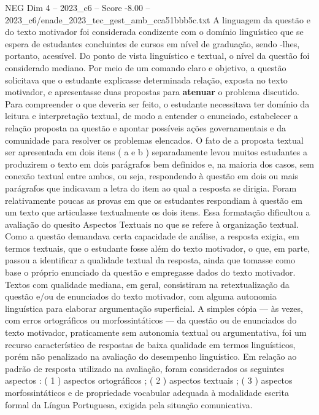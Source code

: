 \begin{textsample}{NEG Dim 4 – 2023\_c6 – Score -8.00 – 2023\_c6/enade\_2023\_tec\_gest\_amb\_cca51bbb5c.txt}
A linguagem da questão e do texto motivador foi considerada condizente com o domínio linguístico que se espera de estudantes concluintes de cursos em nível de graduação, sendo -lhes, portanto, acessível.
Do ponto de vista linguístico e textual, o nível da questão foi considerado mediano.
Por meio de um comando claro e objetivo, a questão solicitava que o estudante explicasse determinada relação, exposta no texto motivador, e apresentasse duas propostas para \textbf{atenuar} o problema discutido.
Para compreender o que deveria ser feito, o estudante necessitava ter domínio da leitura e interpretação textual, de modo a entender o enunciado, estabelecer a relação proposta na questão e apontar possíveis ações governamentais e da comunidade para resolver os problemas elencados.
O fato de a proposta textual ser apresentada em dois itens ( a e b ) separadamente levou muitos estudantes a produzirem o texto em dois parágrafos bem definidos e, na maioria dos casos, sem conexão textual entre ambos, ou seja, respondendo à questão em dois ou mais parágrafos que indicavam a letra do item ao qual a resposta se dirigia.
Foram relativamente poucas as provas em que os estudantes respondiam à questão em um texto que articulasse textualmente os dois itens.
Essa formatação dificultou a avaliação do quesito Aspectos Textuais no que se refere à organização textual.
Como a questão demandava certa capacidade de análise, a resposta exigia, em termos textuais, que o estudante fosse além do texto motivador, o que, em parte, passou a identificar a qualidade textual da resposta, ainda que tomasse como base o próprio enunciado da questão e empregasse dados do texto motivador.
Textos com qualidade mediana, em geral, consistiram na retextualização da questão e/ou de enunciados do texto motivador, com alguma autonomia linguística para elaborar argumentação superficial.
A simples cópia — às vezes, com erros ortográficos ou morfossintáticos — da questão ou de enunciados do texto motivador, praticamente sem autonomia textual ou argumentativa, foi um recurso característico de respostas de baixa qualidade em termos linguísticos, porém não penalizado na avaliação do desempenho linguístico.
Em relação ao padrão de resposta utilizado na avaliação, foram considerados os seguintes aspectos : ( 1 ) aspectos ortográficos ; ( 2 ) aspectos textuais ; ( 3 ) aspectos morfossintáticos e de propriedade vocabular adequada à modalidade escrita formal da Língua Portuguesa, exigida pela situação comunicativa.

\end{textsample}
